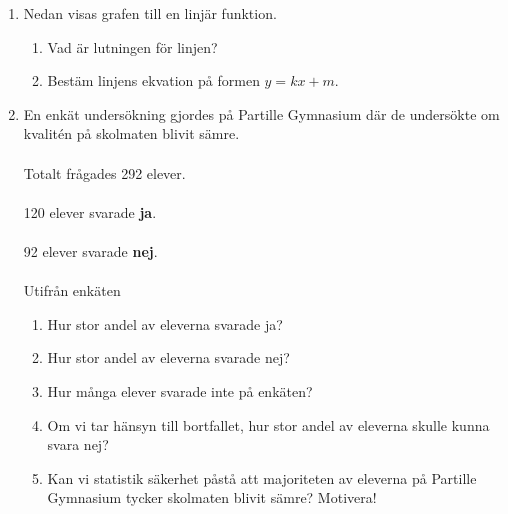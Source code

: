 \documentclass[a4paper,11pt]{article}
\begin{document}
\begin{enumerate}[label=\textbf{\arabic*.}]
\newpage
    \item Nedan visas grafen till en linjär funktion.
    \begin{enumerate}[label=\alph*)]
        \item Vad är lutningen för linjen?
        \item Bestäm linjens ekvation på formen $y = kx + m$.
    \end{enumerate}
    \begin{center}
    \end{center}
    \item En enkät undersökning gjordes på Partille Gymnasium där de undersökte om kvalitén på skolmaten blivit sämre. 
    \\ \\Totalt frågades 292 elever.
    \\ \\120 elever svarade \textbf{ja}.
    \\ \\92 elever svarade \textbf{nej}.
    \\ \\Utifrån enkäten
    \begin{enumerate}[label=\alph*)]
      \item Hur stor andel av eleverna svarade ja?
      \item Hur stor andel av eleverna svarade nej?
      \item Hur många elever svarade inte på enkäten?
      \item Om vi tar hänsyn till bortfallet, hur stor andel av eleverna skulle kunna svara nej?
      \item Kan vi statistik säkerhet påstå att majoriteten av eleverna på Partille Gymnasium tycker skolmaten blivit sämre? Motivera!
      
  \end{enumerate}
\newpage

\end{enumerate}
\end{document}
